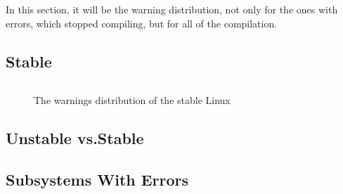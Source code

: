 \documentclass[a4paper,11pt]{report}
\newcommand{\figa}{
    \begin{figure}[!htpb]
    \centering
}
\newcommand{\figb}[2]{
    \caption{#1}
    \label{#2}
    \end{figure}
}
\begin{document}
In this section, it will be the warning distribution, not only for the ones 
with errors, which stopped compiling, but for all of the compilation.


    \subsection{Stable}

\figa
    \begin{tabular}{c|c}

    \end{tabular}
\figb{The warnings distribution of the stable Linux}{tab:stablewarn}


    \subsection{Unstable vs.Stable}


    \subsection{Subsystems With Errors}
\end{document}
